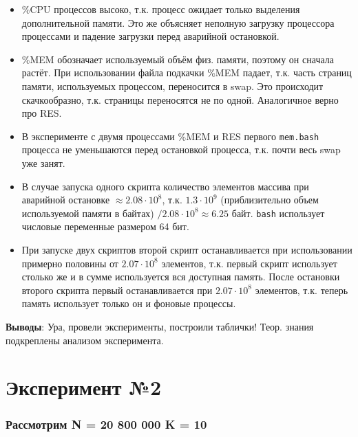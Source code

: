 \documentclass[10pt, a4paper]{article}
\begin{document}
\begin{itemize}
    \item \%CPU процессов высоко, т.к. процесс ожидает только выделения дополнительной памяти. Это же объясняет неполную загрузку процессора процессами и падение загрузки перед аварийной остановкой.
    \item \%MEM обозначает используемый объём физ. памяти, поэтому он сначала растёт. При использовании файла подкачки \%MEM падает, т.к. часть страниц памяти, используемых процессом, переносится в swap. Это происходит скачкообразно, т.к. страницы переносятся не по одной. Аналогичное верно про RES.
    \item В эксперименте с двумя процессами \%MEM и RES первого \texttt{mem.bash} процесса не уменьшаются перед остановкой процесса, т.к. почти весь swap уже занят.
    \item В случае запуска одного скрипта количество элементов массива при аварийной остановке \(\approx 2.08 \cdot 10^{8}\), т.к. \(1.3 \cdot 10^{9}\) (приблизительно объем используемой памяти в байтах) \(/ 2.08 \cdot 10^8 \approx 6.25\) байт. \texttt{bash} использует числовые переменные размером 64 бит.
    \item При запуске двух скриптов второй скрипт останавливается при использовании примерно половины от $2.07 \cdot 10^8$ элементов, т.к. первый скрипт использует столько же и в сумме используется вся доступная память. После остановки второго скрипта первый останавливается при $2.07 \cdot 10^8$ элементов, т.к. теперь память использует только он и фоновые процессы.
\end{itemize}

\textbf{Выводы}: Ура, провели эксперименты, построили таблички! Теор. знания подкреплены анализом эксперимента.

\section*{Эксперимент №2}

\subsubsection*{Рассмотрим \textbf{N = 20 800 000} \textbf{K = 10}}
\end{document}
